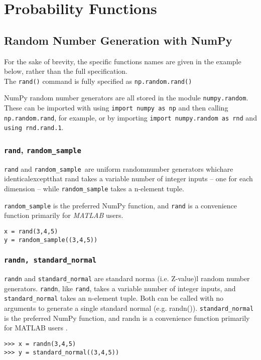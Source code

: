 \documentclass[Pydata.tex]{subfiles}
\begin{document}
 
	\large
\section{Probability Functions}


\subsection{Random Number Generation with NumPy}
\begin{framed}
\noindent For the sake of brevity, the specific functions names are given in the example below, rather than the full specification.
\\
The \texttt{rand()} command is fully specified as \texttt{np.random.rand()}

\end{framed}
NumPy random number generators are all stored in the module \texttt{numpy.random}. 
These can be imported with using \texttt{import numpy as np} and then calling \texttt{np.random.rand}, for example, or 
by importing \texttt{import numpy.random as rnd} and \texttt{using rnd.rand.1}.
\subsubsection{\texttt{rand}, \texttt{random\_sample}}
\texttt{rand} and \texttt{random\_sample }are uniform randomnumber generators whichare
 identicalexceptthat rand takes a variable number 
of integer inputs – one for each dimension – while \texttt{random\_sample} takes a n-element tuple. 

\noindent \texttt{random\_sample} is the preferred NumPy function, and \texttt{rand} is a convenience function primarily for \textit{MATLAB} users.
\begin{framed}
\begin{verbatim}
x = rand(3,4,5) 
y = random_sample((3,4,5))
\end{verbatim}
\end{framed}


\subsubsection{\texttt{randn, standard\_normal}}
\texttt{randn} and \texttt{standard\_normal} are standard norma (i.e. Z-value)l random number generators. \texttt{randn}, like \texttt{rand}, takes a
variable number of integer inputs, and \texttt{standard\_normal} takes an n-element tuple. Both can be called
with no arguments to generate a single standard normal (e.g. randn()). \texttt{standard\_normal }is the preferred
NumPy function, and randn is a convenience function primarily for MATLAB users .
\begin{framed}
\begin{verbatim}
>>> x = randn(3,4,5)
>>> y = standard_normal((3,4,5))
\end{verbatim}
\end{framed}
\end{document}
